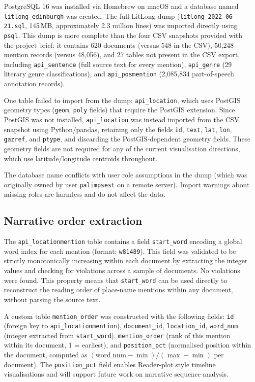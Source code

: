 \documentclass[logo,msc]{infthesis}
\begin{document}
PostgreSQL 16 was installed via Homebrew on macOS and a database named \texttt{litlong\_edinburgh} was created. The full LitLong dump (\texttt{litlong\_2022-06-21.sql}, 145\,MB, approximately 2.3 million lines) was imported directly using \texttt{psql}. This dump is more complete than the four CSV snapshots provided with the project brief: it contains 620 documents (versus 548 in the CSV), 50,248 mention records (versus 48,056), and 27 tables not present in the CSV export, including \texttt{api\_sentence} (full source text for every mention), \texttt{api\_genre} (29 literary genre classifications), and \texttt{api\_posmention} (2,085,834 part-of-speech annotation records).
 
One table failed to import from the dump: \texttt{api\_location}, which uses PostGIS geometry types (\texttt{geom}, \texttt{poly} fields) that require the PostGIS extension. Since PostGIS was not installed, \texttt{api\_location} was instead imported from the CSV snapshot using Python/pandas, retaining only the fields \texttt{id}, \texttt{text}, \texttt{lat}, \texttt{lon}, \texttt{gazref}, and \texttt{ptype}, and discarding the PostGIS-dependent geometry fields. These geometry fields are not required for any of the current visualisation directions, which use latitude/longitude centroids throughout.
 
The database name conflicts with user role assumptions in the dump (which was originally owned by user \texttt{palimpsest} on a remote server). Import warnings about missing roles are harmless and do not affect the data.
 
\subsection*{Narrative order extraction}
 
The \texttt{api\_locationmention} table contains a field \texttt{start\_word} encoding a global word index for each mention (format: \texttt{w81489}). This field was validated to be strictly monotonically increasing within each document by extracting the integer values and checking for violations across a sample of documents. No violations were found. This property means that \texttt{start\_word} can be used directly to reconstruct the reading order of place-name mentions within any document, without parsing the source text.
 
A custom table \texttt{mention\_order} was constructed with the following fields: \texttt{id} (foreign key to \texttt{api\_locationmention}), \texttt{document\_id}, \texttt{location\_id}, \texttt{word\_num} (integer extracted from \texttt{start\_word}), \texttt{mention\_order} (rank of this mention within its document, $1$ = earliest), and \texttt{position\_pct} (normalised position within the document, computed as $(\text{word\_num} - \min) / (\max - \min)$ per document). The \texttt{position\_pct} field enables Reader-plot style timeline visualisations and will support future work on narrative sequence analysis.
 
\end{document}
